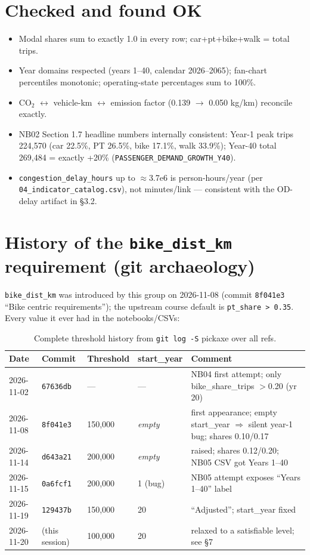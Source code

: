 \documentclass[11pt,a4paper]{article}
\begin{document}
\section{Checked and found OK}
\begin{itemize}
  \item Modal shares sum to exactly 1.0 in every row; car+pt+bike+walk = total trips.
  \item Year domains respected (years 1--40, calendar 2026--2065); fan-chart
        percentiles monotonic; operating-state percentages sum to 100\%.
  \item CO$_2$ $\leftrightarrow$ vehicle-km $\leftrightarrow$ emission factor
        (0.139 $\to$ 0.050 kg/km) reconcile exactly.
  \item NB02 Section 1.7 headline numbers internally consistent: Year-1 peak trips
        224{,}570 (car 22.5\%, PT 26.5\%, bike 17.1\%, walk 33.9\%); Year-40 total
        269{,}484 = exactly +20\% (\texttt{PASSENGER\_DEMAND\_GROWTH\_Y40}).
  \item \texttt{congestion\_delay\_hours} up to $\approx$3.7e6 is person-hours/year
        (per \texttt{04\_indicator\_catalog.csv}), not minutes/link --- consistent with
        the OD-delay artifact in \S3.2.
\end{itemize}

\section{History of the \texttt{bike\_dist\_km} requirement (git archaeology)}
\texttt{bike\_dist\_km} was introduced by this group on 2026-11-08 (commit
\texttt{8f041e3} ``Bike centric requirements''); the upstream course default is
\texttt{pt\_share > 0.35}. Every value it ever had in the notebooks/CSVs:

\begin{table}[h]
\centering\small
\begin{tabular}{@{}lllp{2.2cm}>{\raggedright\arraybackslash}p{4.6cm}@{}}
\toprule
Date & Commit & Threshold & start\_year & Comment \\
\midrule
2026-11-02 & \texttt{67636db} & --- & --- & NB04 first attempt; only bike\_share\_trips ${>}$0.20 (yr 20) \\
2026-11-08 & \texttt{8f041e3} & 150{,}000 & \emph{empty} & first appearance; empty start\_year $\Rightarrow$ silent year-1 bug; shares 0.10/0.17 \\
2026-11-14 & \texttt{d643a21} & 200{,}000 & \emph{empty} & raised; shares 0.12/0.20; NB05 CSV got Years 1--40 \\
2026-11-15 & \texttt{0a6fcf1} & 200{,}000 & 1 (bug) & NB05 attempt exposes ``Years 1--40'' label \\
2026-11-19 & \texttt{129437b} & 150{,}000 & 20 & ``Adjusted''; start\_year fixed \\
2026-11-20 & (this session) & 100{,}000 & 20 & relaxed to a satisfiable level; see \S7 \\
\bottomrule
\end{tabular}
\caption{Complete threshold history from \texttt{git log -S} pickaxe over all refs.}
\end{table}
\end{document}
